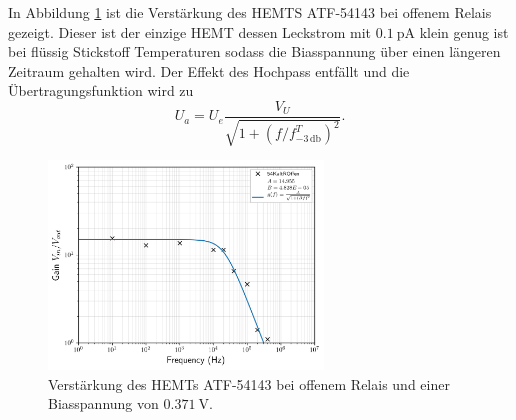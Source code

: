 In Abbildung \ref{fig:54RClosed} ist die Verstärkung des HEMTS ATF-54143 bei offenem Relais gezeigt.
Dieser ist der einzige HEMT dessen Leckstrom mit $\SI{0.1}{\pico\ampere}$ klein genug ist bei flüssig Stickstoff Temperaturen sodass die Biasspannung über einen längeren Zeitraum gehalten wird.
Der Effekt des Hochpass entfällt und die Übertragungsfunktion wird zu
\begin{equation}
U_a = U_e \frac{V_U}{\sqrt{1+(f/f^T_{-3\,\mathrm{db}})^2}}.
\end{equation}

\begin{figure}[!t]
\begin{center}
\includegraphics[width=0.65\textwidth]{./fig/Gain/G54ColdROpen.png}
\vspace{-0.5cm}
\caption{Verstärkung des HEMTs  ATF-54143 bei offenem Relais und einer Biasspannung von $\SI{0.371}{\volt}$.}
\label{fig:54RClosed}
\end{center}
\end{figure}



